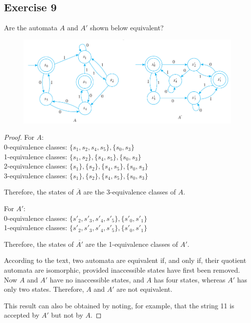 \documentclass[14pt]{extarticle}
\begin{document}
\subsection{Exercise 9}
Are the automata \(A\) and \(A'\) shown below equivalent?

\begin{figure}[ht!]
\centering
\includegraphics[scale=0.5]{../images/12.3.9.png}
\end{figure}

\begin{proof}
For \(A\): \\
0-equivalence classes: \(\{s_1, s_2, s_4, s_5\}, \{s_0, s_3\}\) \\
1-equivalence classes: \(\{s_1, s_2\}, \{s_4, s_5\}, \{s_0, s_3\}\) \\
2-equivalence classes: \(\{s_1\}, \{s_2\}, \{s_4, s_5\}, \{s_0, s_3\}\) \\
3-equivalence classes: \(\{s_1\}, \{s_2\}, \{s_4, s_5\}, \{s_0, s_3\}\)

Therefore, the states of \(\overline{A}\) are the 3-equivalence classes of \(A\).

For \(A'\): \\
0-equivalence classes: \(\{s'_2, s'_3, s'_4, s'_5\}, \{s'_0, s'_1\}\) \\
1-equivalence classes: \(\{s'_2, s'_3, s'_4, s'_5\}, \{s'_0, s'_1\}\)

Therefore, the states of \(\overline{A'}\) are the 1-equivalence classes of \(A'\).

According to the text, two automata are equivalent if, and only if, their quotient automata are isomorphic, provided 
inaccessible states have first been removed. Now \(A\) and \(A'\) have no inaccessible states, and \(A\) has four states, 
whereas \(A'\) has only two states. Therefore, \(A\) and \(A'\) are not equivalent.

This result can also be obtained by noting, for example, that the string 11 is accepted by \(A'\) but not by \(A\).
\end{proof}
\end{document}
